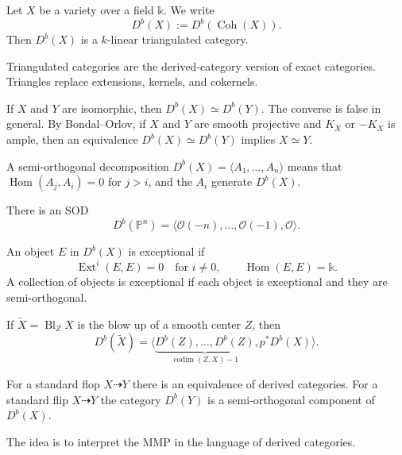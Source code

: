 \medskip\noindent
Let $X$ be a variety over a field
$\mathbb k$.
We write
\[
D^b(X):=D^b(\operatorname{Coh}(X)).
\]
Then $D^b(X)$ is a $k$-linear
triangulated category.

\medskip\noindent
Triangulated categories are the
derived-category version of exact
categories.
Triangles replace extensions, kernels,
and cokernels.

\medskip\noindent
If $X$ and $Y$ are isomorphic, then
$D^b(X)\simeq D^b(Y)$.
The converse is false in general.
By Bondal--Orlov, if $X$ and $Y$ are
smooth projective and $K_X$ or $-K_X$
is ample, then an equivalence
$D^b(X)\simeq D^b(Y)$ implies
$X\simeq Y$.

\begin{definition}
\label{definition-semi-orthogonal}
A semi-orthogonal decomposition
$D^b(X)=\langle A_1,\dots,A_n\rangle$
means that
$\operatorname{Hom}(A_j,A_i)=0$
for $j>i$, and the $A_i$ generate
$D^b(X)$.
\end{definition}

\begin{example}[Beilinson]
\label{example-sod-d}
There is an SOD
\[
D^b(\mathbb P^n)
=\langle
\mathcal O(-n),\dots,
\mathcal O(-1),\mathcal O
\rangle.
\]
\end{example}

\begin{definition}
\label{definition-object-e}
An object $E$ in $D^b(X)$ is
exceptional if
\[
\operatorname{Ext}^i(E,E)=0
\quad\text{for }i\neq 0,
\qquad
\operatorname{Hom}(E,E)=\mathbb k.
\]
A collection of objects is exceptional
if each object is exceptional and they
are semi-orthogonal.
\end{definition}

\begin{theorem}[Orlov]
\label{theorem-x-z}
If $\widetilde X=\operatorname{Bl}_Z X$
is the blow up of a smooth center $Z$,
then
\[
D^b(\widetilde X)
=\langle
\underbrace{D^b(Z),\dots,D^b(Z)}_
{\operatorname{codim}(Z,X)-1},
p^*D^b(X)
\rangle.
\]
\end{theorem}

\begin{theorem}
\label{theorem-standard-flop}
For a standard flop $X\dashrightarrow Y$
there is an equivalence of derived
categories.
For a standard flip $X\dashrightarrow Y$
the category $D^b(Y)$ is a
semi-orthogonal component of
$D^b(X)$.
\end{theorem}

\medskip\noindent
The idea is to interpret the MMP in the
language of derived categories.

